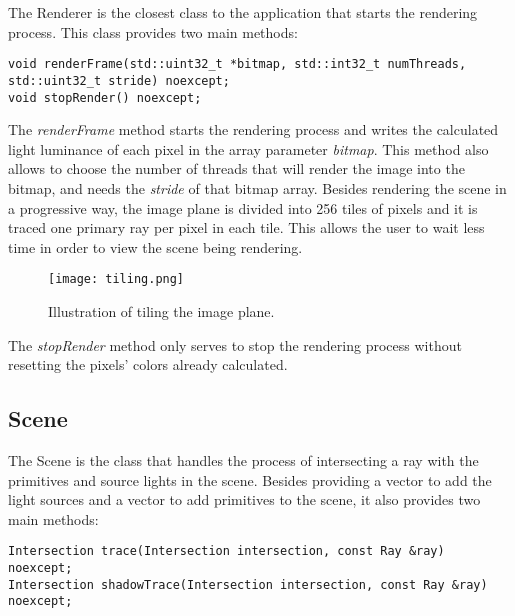 \par
The Renderer is the closest class to the application that starts the rendering process.
This class provides two main methods:

\begin{lstlisting}[caption={Main methods in Renderer}, captionpos=b, label=Renderer]
void renderFrame(std::uint32_t *bitmap, std::int32_t numThreads, std::uint32_t stride) noexcept;
void stopRender() noexcept;
\end{lstlisting}

\par
The \textit{renderFrame} method starts the rendering process and writes the calculated light luminance of each pixel in the array parameter \textit{bitmap}.
This method also allows to choose the number of threads that will render the image into the bitmap, and needs the \textit{stride} of that bitmap array.
Besides rendering the scene in a progressive way, the image plane is divided into 256 tiles of pixels and it is traced one primary ray per pixel in each tile.
This allows the user to wait less time in order to view the scene being rendering.

\begin{figure}[H]
	\centering
	\caption{Illustration of tiling the image plane.}
	\label{Illustration of tiling the image plane.}
	\texttt{[image: tiling.png]}
\end{figure}

\par
The \textit{stopRender} method only serves to stop the rendering process without resetting the pixels' colors already calculated.

\subsection{Scene}

\par
The Scene is the class that handles the process of intersecting a ray with the primitives and source lights in the scene.
Besides providing a vector to add the light sources and a vector to add primitives to the scene, it also provides two main methods:

\begin{lstlisting}[caption={Main methods in Scene}, captionpos=b, label=Scene]
Intersection trace(Intersection intersection, const Ray &ray) noexcept;
Intersection shadowTrace(Intersection intersection, const Ray &ray) noexcept;
\end{lstlisting}


